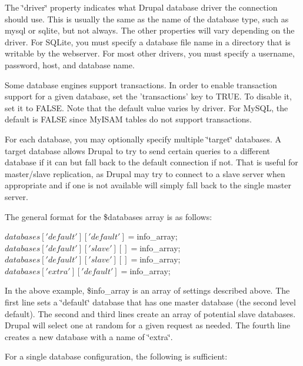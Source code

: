 The \char`\"{}driver\char`\"{} property indicates what Drupal database driver the connection should use. This is usually the same as the name of the database type, such as mysql or sqlite, but not always. The other properties will vary depending on the driver. For SQLite, you must specify a database file name in a directory that is writable by the webserver. For most other drivers, you must specify a username, password, host, and database name.

Some database engines support transactions. In order to enable transaction support for a given database, set the 'transactions' key to TRUE. To disable it, set it to FALSE. Note that the default value varies by driver. For MySQL, the default is FALSE since MyISAM tables do not support transactions.

For each database, you may optionally specify multiple \char`\"{}target\char`\"{} databases. A target database allows Drupal to try to send certain queries to a different database if it can but fall back to the default connection if not. That is useful for master/slave replication, as Drupal may try to connect to a slave server when appropriate and if one is not available will simply fall back to the single master server.

The general format for the \$databases array is as follows: 
\begin{DoxyCode}
 $databases['default']['default'] = $info_array;
 $databases['default']['slave'][] = $info_array;
 $databases['default']['slave'][] = $info_array;
 $databases['extra']['default'] = $info_array;
\end{DoxyCode}


In the above example, \$info\_\-array is an array of settings described above. The first line sets a \char`\"{}default\char`\"{} database that has one master database (the second level default). The second and third lines create an array of potential slave databases. Drupal will select one at random for a given request as needed. The fourth line creates a new database with a name of \char`\"{}extra\char`\"{}.

For a single database configuration, the following is sufficient: 



